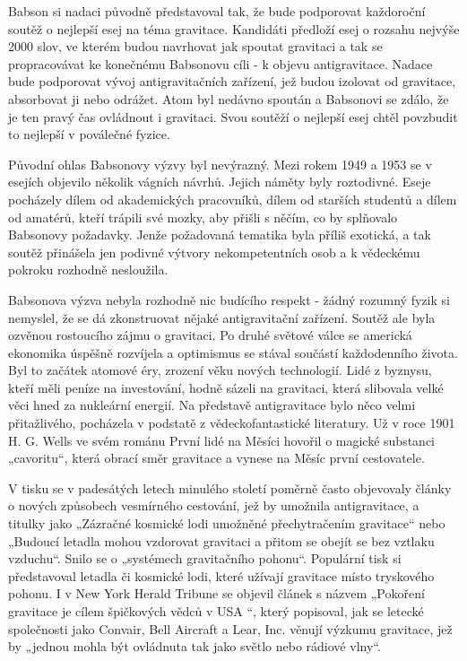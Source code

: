   Babson si nadaci původně představoval tak, že bude podporovat každoroční soutěž o nejlepší esej na
  téma gravitace. Kandidáti předloží esej o rozsahu nejvýše 2000 slov, ve kterém budou navrhovat jak
  spoutat gravitaci a tak se propracovávat ke konečnému Babsonovu cíli - k objevu antigravitace.
  Nadace bude podporovat vývoj antigravitačních zařízení, jež budou izolovat od gravitace,
  absorbovat ji nebo odrážet. Atom byl nedávno spoután a Babsonovi se zdálo, že je ten pravý čas
  ovládnout i gravitaci. Svou soutěží o nejlepší esej chtěl povzbudit to nejlepší v poválečné
  fyzice. 

  Původní ohlas Babsonovy výzvy byl nevýrazný. Mezi rokem 1949 a 1953 se v esejích objevilo několik
  vágních návrhů. Jejich náměty byly roztodivné. Eseje pocházely dílem od akademických pracovníků,
  dílem od starších studentů a dílem od amatérů, kteří trápili své mozky, aby přišli s něčím, co by
  splňovalo Babsonovy požadavky. Jenže požadovaná tematika byla příliš exotická, a tak soutěž
  přinášela jen podivné výtvory nekompetentních osob a k vědeckému pokroku rozhodně nesloužila. 

  Babsonova výzva nebyla rozhodně nic budícího respekt - žádný rozumný fyzik si nemyslel, že se dá
  zkonstruovat nějaké antigravitační zařízení. Soutěž ale byla ozvěnou rostoucího zájmu o gravitaci.
  Po druhé světové válce se americká ekonomika úspěšně rozvíjela a optimismus se stával součástí
  každodenního života. Byl to začátek atomové éry, zrození věku nových technologií. Lidé z
  byznysu, kteří měli peníze na investování, hodně sázeli na gravitaci, která slibovala velké věci
  hned za nukleární energií. Na představě antigravitace bylo něco velmi přitažlivého, pocházela v
  podstatě z vědeckofantastické literatury. Už v roce 1901 H. G. Wells ve svém románu První lidé na
  Měsíci hovořil o magické substanci „cavoritu“, která obrací směr gravitace a vynese na Měsíc první
  cestovatele. 

  V tisku se v padesátých letech minulého století poměrně často objevovaly články o nových způsobech
  vesmírného cestování, jež by umožnila antigravitace, a titulky jako „Zázračné kosmické lodi
  umožněné přechytračením gravitace“ nebo „Budoucí letadla mohou vzdorovat gravitaci a přitom se
  obejít se bez vztlaku vzduchu“. Snilo se o „systémech gravitačního pohonu“. Populární tisk si
  představoval letadla či kosmické lodi, které užívají gravitace místo tryskového pohonu. I v New
  York Herald Tribune se objevil článek s názvem „Pokoření gravitace je cílem špičkových vědců v USA
  “, který popisoval, jak se letecké společnosti jako Convair, Bell Aircraft a Lear, Inc. věnují
  výzkumu gravitace, jež by „jednou mohla být ovládnuta tak jako světlo nebo rádiové vlny“.

